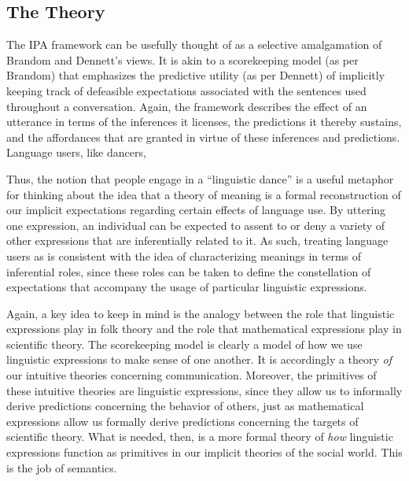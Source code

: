 \subsection{The Theory}

The IPA framework can be usefully thought of as a selective amalgamation of Brandom and Dennett's views. It is akin to a scorekeeping model (as per Brandom) that emphasizes the predictive utility (as per Dennett) of implicitly keeping track of defeasible expectations associated with the sentences used throughout a conversation. Again, the framework describes the effect of an utterance in terms of the inferences it licenses, the predictions it thereby sustains, and the affordances that are granted in virtue of these inferences and predictions. Language users, like dancers, 



Thus, the notion that people engage in a ``linguistic dance'' is a useful metaphor for thinking about the idea that a theory of meaning is a formal reconstruction of our implicit expectations regarding certain effects of language use. By uttering one expression, an individual can be expected to assent to or deny a variety of other expressions that are inferentially related to it. As such, treating language users as  is consistent with the idea of characterizing meanings in terms of inferential roles, since these roles can be taken to define the constellation of expectations that accompany the usage of particular linguistic expressions. 



Again, a key idea to keep in mind is the analogy between the role that linguistic expressions play in folk theory and the role that mathematical expressions play in scientific theory. The scorekeeping model is clearly a model of how we use linguistic expressions to make sense of one another. It is accordingly a theory \textit{of} our intuitive theories concerning communication. Moreover, the primitives of these intuitive theories are linguistic expressions, since they allow us to informally derive predictions concerning the behavior of others, just as mathematical expressions allow us formally derive predictions concerning the targets of scientific theory. What is needed, then, is a more formal theory of \textit{how} linguistic expressions function as primitives in our implicit theories of the social world. This is the job of semantics.

